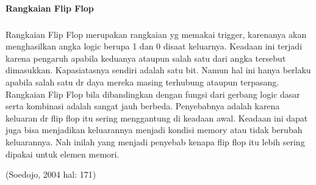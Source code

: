 \documentclass[12pt,a4paper]{article}
\begin{document}
	\paragraph{ }
\textbf{Rangkaian Flip Flop}
\subparagraph{ }
	Rangkaian Flip Flop merupakan rangkaian yg memakai trigger, karenanya akan menghasilkan angka logic berupa 1 dan 0 disaat keluarnya. Keadaan ini terjadi karena pengaruh apabila keduanya ataupun salah satu dari angka tersebut dimasukkan. Kapasiatasnya sendiri adalah satu bit. Namun hal ini hanya berlaku apabila salah satu dr daya mereka masing terhubung ataupun terpasang. Rangkaian Flip Flop bila dibandingkan dengan fungsi dari gerbang logic dasar serta kombinasi adalah sangat jauh berbeda. Penyebabnya adalah karena keluaran dr flip flop itu sering menggantung di keadaan awal. Keadaan ini dapat juga bisa menjadikan keluarannya menjadi kondisi memory atau tidak berubah keluarannya. Nah inilah yang menjadi penyebab kenapa flip flop itu lebih sering dipakai untuk elemen memori.

\begin{flushright}
	(Soedojo, 2004 hal: 171) 
\end{flushright}
\end{document}
